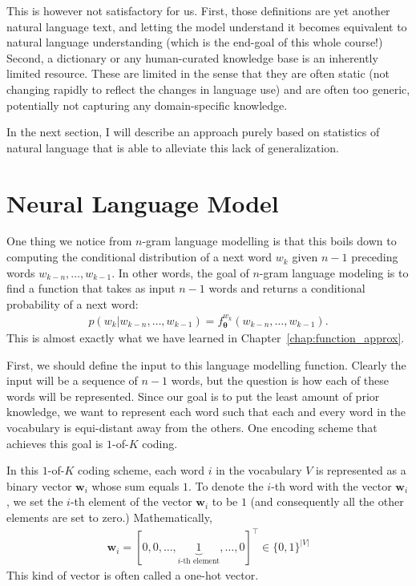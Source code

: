 \documentclass{report}
\newcommand{\vect}[1]{\mathbf{#1}}
\newcommand{\vects}[1]{\boldsymbol{#1}}
\newcommand{\vw}[0]{\vect{w}}
\newcommand{\TT}[0]{\vects{\theta}}
\begin{document}
This is however not satisfactory for us. First, those definitions are yet
another natural language text, and letting the model understand it becomes
equivalent to natural language understanding (which is the end-goal of this
whole course!) Second, a dictionary or any human-curated knowledge base is
an inherently limited resource. These are limited in the sense that they are
often static (not changing rapidly to reflect the changes in language use) and
are often too generic, potentially not capturing any domain-specific knowledge. 

In the next section, I will describe an approach purely based on statistics of
natural language that is able to alleviate this lack of generalization.

\section{Neural Language Model}
\label{sec:nlm}

One thing we notice from $n$-gram language modelling is that this boils down to
computing the conditional distribution of a next word $w_k$ given $n-1$
preceding words $w_{k-n}, \ldots, w_{k-1}$. In other words, the goal of $n$-gram
language modeling is to find a function that takes as input $n-1$ words and
returns a conditional probability of a next word:
\begin{align*}
    p(w_k | w_{k-n}, \ldots, w_{k-1}) = f_{\TT}^{w_k} (w_{k-n}, \ldots,
    w_{k-1}).
\end{align*}
This is almost exactly what we have learned in
Chapter~\ref{chap:function_approx}.

First, we should define the input to this language modelling function. Clearly
the input will be a sequence of $n-1$ words, but the question is how each of
these words will be represented. Since our goal is to put the least amount of
prior knowledge, we want to represent each word such that each and every word in
the vocabulary is equi-distant away from the others. One encoding scheme that
achieves this goal is $1$-of-$K$ coding. 

In this $1$-of-$K$ coding scheme, each word $i$ in the vocabulary $V$ is
represented as a binary vector $\vw_i$ whose sum equals $1$. To denote the $i$-th
word with the vector $\vw_i$, we set the $i$-th element of the vector $\vw_i$ to be
$1$ (and consequently all the other elements are set to zero.) Mathematically,
\begin{align}
    \label{eq:one_hot_vector}
    \vw_i = [0, 0, \ldots, \underbrace{1}_{\text{$i$-th element}}, \ldots,
    0]^{\top} \in \{0,1\}^{|V|}
\end{align}
This kind of vector is often called a one-hot vector.
\end{document}
